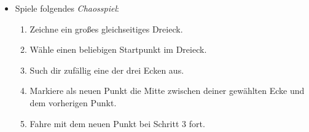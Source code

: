 \documentclass[a4paper,ngerman]{scrartcl}
\begin{document}
\vfill
\Large

\renewcommand{\labelitemi}{$\blacktriangle$}

\begin{itemize}
  \item Spiele folgendes \emph{Chaosspiel}:
  \begin{enumerate}
    \item Zeichne ein großes gleichseitiges Dreieck.
    \item Wähle einen beliebigen Startpunkt im Dreieck.
    \item Such dir zufällig eine der drei Ecken aus.
    \item Markiere als neuen Punkt die Mitte zwischen deiner gewählten Ecke und \\ dem
    vorherigen Punkt.
    \item Fahre mit dem neuen Punkt bei Schritt 3 fort.
  \end{enumerate}
\end{itemize}
\end{document}
